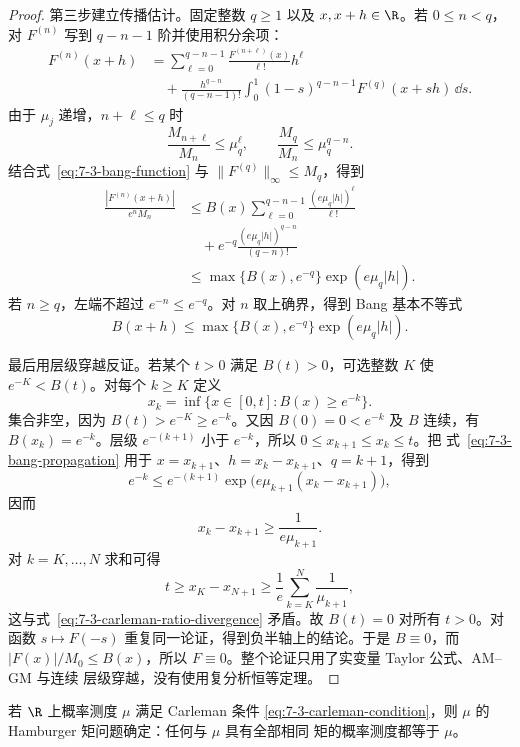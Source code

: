\begin{proof}
第三步建立传播估计。固定整数 $q\geq1$ 以及 $x,x+h\in\R$。若 $0\leq n<q$，对
$F^{(n)}$ 写到 $q-n-1$ 阶并使用积分余项：
\begin{align*}
 F^{(n)}(x+h)
 &=\sum_{\ell=0}^{q-n-1}
   \frac{F^{(n+\ell)}(x)}{\ell!}h^\ell\\
 &\quad+\frac{h^{q-n}}{(q-n-1)!}
   \int_0^1(1-s)^{q-n-1}F^{(q)}(x+sh)\,\dd s.
\end{align*}
由于 $\mu_j$ 递增，$n+\ell\leq q$ 时
\[
 \frac{M_{n+\ell}}{M_n}\leq\mu_q^\ell,
 \qquad
 \frac{M_q}{M_n}\leq\mu_q^{q-n}.
\]
结合式~\eqref{eq:7-3-bang-function} 与
$\|F^{(q)}\|_\infty\leq M_q$，得到
\begin{align*}
 \frac{|F^{(n)}(x+h)|}{e^nM_n}
 &\leq B(x)\sum_{\ell=0}^{q-n-1}
   \frac{(e\mu_q|h|)^\ell}{\ell!}\\
 &\quad+e^{-q}\frac{(e\mu_q|h|)^{q-n}}{(q-n)!}\\
 &\leq\max\{B(x),e^{-q}\}\exp(e\mu_q|h|).
\end{align*}
若 $n\geq q$，左端不超过 $e^{-n}\leq e^{-q}$。对 $n$ 取上确界，得到 Bang 基本不等式
\begin{equation}\label{eq:7-3-bang-propagation}
 B(x+h)\leq\max\{B(x),e^{-q}\}\exp(e\mu_q|h|).
\end{equation}

最后用层级穿越反证。若某个 $t>0$ 满足 $B(t)>0$，可选整数 $K$ 使
$e^{-K}<B(t)$。对每个 $k\geq K$ 定义
\[
 x_k=\inf\{x\in[0,t]:B(x)\geq e^{-k}\}.
\]
集合非空，因为 $B(t)>e^{-K}\geq e^{-k}$。又因 $B(0)=0<e^{-k}$ 及 $B$ 连续，有
$B(x_k)=e^{-k}$。层级 $e^{-(k+1)}$ 小于 $e^{-k}$，所以
$0\leq x_{k+1}\leq x_k\leq t$。把
式~\eqref{eq:7-3-bang-propagation} 用于
$x=x_{k+1}$、$h=x_k-x_{k+1}$、$q=k+1$，得到
\[
 e^{-k}\leq e^{-(k+1)}
 \exp\!\bigl(e\mu_{k+1}(x_k-x_{k+1})\bigr),
\]
因而
\[
 x_k-x_{k+1}\geq\frac1{e\mu_{k+1}}.
\]
对 $k=K,\ldots,N$ 求和可得
\[
 t\geq x_K-x_{N+1}
 \geq\frac1e\sum_{k=K}^N\frac1{\mu_{k+1}},
\]
这与式~\eqref{eq:7-3-carleman-ratio-divergence} 矛盾。故 $B(t)=0$ 对所有 $t>0$。对函数
$s\mapsto F(-s)$ 重复同一论证，得到负半轴上的结论。于是 $B\equiv0$，而
$|F(x)|/M_0\leq B(x)$，所以 $F\equiv0$。整个论证只用了实变量 Taylor 公式、AM--GM 与连续
层级穿越，没有使用复分析恒等定理。
\end{proof}

\begin{theorem}[Carleman 定理]\label{theorem:7-3-3-2}
若 $\R$ 上概率测度 $\mu$ 满足 Carleman 条件
\eqref{eq:7-3-carleman-condition}，则 $\mu$ 的 Hamburger 矩问题确定：任何与 $\mu$ 具有全部相同
矩的概率测度都等于 $\mu$。
\end{theorem}

